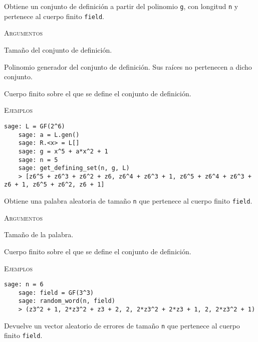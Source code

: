 \begin{description}[leftmargin=1em, font=\normalfont\ttfamily, style=nextline]
  \item[get\_defining\_set(n, pol, field)]

  Obtiene un conjunto de definición a partir del polinomio \texttt{g}, con longitud \texttt{n} y pertenece al cuerpo finito \texttt{field}.

  \textsc{Argumentos}
  \begin{description}[font=\normalfont\ttfamily]
    \item[n] Tamaño del conjunto de definición.
    \item[pol] Polinomio generador del conjunto de definición. Sus raíces no pertenecen a dicho conjunto.
    \item[field] Cuerpo finito sobre el que se define el conjunto de definición.
  \end{description}

  \textsc{Ejemplos}
  \begin{lstlisting}[gobble=4]
    sage: L = GF(2^6)
    sage: a = L.gen()
    sage: R.<x> = L[]
    sage: g = x^5 + a*x^2 + 1
    sage: n = 5
    sage: get_defining_set(n, g, L)
    > [z6^5 + z6^3 + z6^2 + z6, z6^4 + z6^3 + 1, z6^5 + z6^4 + z6^3 + z6 + 1, z6^5 + z6^2, z6 + 1]
  \end{lstlisting}

  \item[random\_word(n, field)]

  Obtiene una palabra aleatoria de tamaño \texttt{n} que pertenece al cuerpo finito \texttt{field}.

  \textsc{Argumentos}
  \begin{description}[font=\normalfont\ttfamily]
    \item[n] Tamaño de la palabra.
    \item[field] Cuerpo finito sobre el que se define el conjunto de definición.
  \end{description}

  \textsc{Ejemplos}
  \begin{lstlisting}[gobble=4]
    sage: n = 6
    sage: field = GF(3^3)
    sage: random_word(n, field)
    > (z3^2 + 1, 2*z3^2 + z3 + 2, 2, 2*z3^2 + 2*z3 + 1, 2, 2*z3^2 + 1)
  \end{lstlisting}

  \item[random\_error(n, num\_errors, field)]

  Devuelve un vector aleatorio de errores de tamaño \texttt{n} que pertenece al cuerpo finito \texttt{field}.


\end{description}
